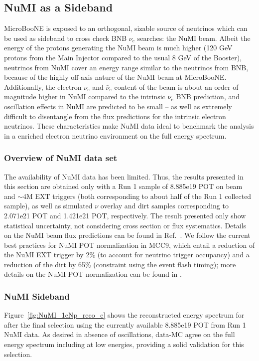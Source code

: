\subsection{NuMI as a Sideband}
MicroBooNE is exposed to an orthogonal, sizable source of neutrinos which can be used as sideband to cross check BNB $\nu_e$ searches: the NuMI beam.  Albeit the energy of the protons generating the NuMI beam is much higher (120 GeV protons from the Main Injector compared to the usual 8 GeV of the Booster),  neutrinos from NuMI cover an energy range similar to the neutrinos from BNB, because of the highly off-axis nature of the NuMI beam at MicroBooNE. Additionally, the electron $\nu_e$ and $\bar\nu_e$ content of the beam is about an order of magnitude higher in NuMI compared to the intrinsic $\nu_e$ BNB prediction, and  oscillation effects in NuMI are predicted to be small -- as well as extremely difficult to disentangle from the flux predictions for the intrinsic electron neutrinos. These characteristics make NuMI data ideal to benchmark the analysis in a enriched electron neutrino environment on the full energy spectrum.

\subsubsection{Overview of NuMI data set}
The availability of NuMI data has been limited. Thus, the results presented in this section are obtained only with a Run 1 sample of 8.885e19 POT on beam and $\sim$4M EXT triggers (both corresponding to about half of the  Run 1 collected sample), as well as simulated $\nu$ overlay and dirt samples corresponding to 2.071e21 POT  and 1.421e21 POT, respectively. The result presented only show statistical uncertainty, not considering cross section or flux systematics. Details on the NuMI beam  flux predictions can be found in Ref.~\cite{bib:NuMIFlux}. We follow the current best practices for NuMI POT normalization in MCC9, which entail a reduction of the NuMI EXT trigger by 2\% (to account for neutrino trigger occupancy) and a reduction of the dirt by 65\% (constraint using the event flash timing); more details on the NuMI POT normalization can be found in \cite{bib:NuMINorm}. 


\subsubsection{NuMI 
\npsel Sideband}
Figure~\ref{fig:NuMI_1eNp_reco_e} shows the reconstructed energy spectrum for \npsel after the final \npsel selection using the currently available 8.885e19  POT from Run 1 NuMI data. As desired in absence of oscillations, data-MC agree on the full energy spectrum including at low energies, providing a solid validation for this selection.

